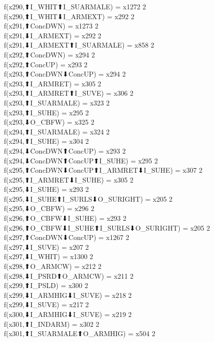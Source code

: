 f(x290,⬆I_WHIT⬆I_SUARMALE) = x1272 {2} \\
f(x290,⬆I_WHIT⬇I_ARMEXT) = x292 {2} \\
f(x291,⬆ConcDWN) = x1273 {2} \\
f(x291,⬇I_ARMEXT) = x292 {2} \\
f(x291,⬇I_ARMEXT⬆I_SUARMALE) = x858 {2} \\
f(x292,⬆ConcDWN) = x294 {2} \\
f(x292,⬆ConcUP) = x293 {2} \\
f(x293,⬆ConcDWN⬇ConcUP) = x294 {2} \\
f(x293,⬆I_ARMRET) = x305 {2} \\
f(x293,⬆I_ARMRET⬆I_SUVE) = x306 {2} \\
f(x293,⬆I_SUARMALE) = x323 {2} \\
f(x293,⬆I_SUHE) = x295 {2} \\
f(x293,⬇O_CBFW) = x325 {2} \\
f(x294,⬆I_SUARMALE) = x324 {2} \\
f(x294,⬆I_SUHE) = x304 {2} \\
f(x294,⬇ConcDWN⬆ConcUP) = x293 {2} \\
f(x294,⬇ConcDWN⬆ConcUP⬆I_SUHE) = x295 {2} \\
f(x295,⬆ConcDWN⬇ConcUP⬆I_ARMRET⬇I_SUHE) = x307 {2} \\
f(x295,⬆I_ARMRET⬇I_SUHE) = x305 {2} \\
f(x295,⬇I_SUHE) = x293 {2} \\
f(x295,⬇I_SUHE⬆I_SURLS⬇O_SURIGHT) = x205 {2} \\
f(x295,⬇O_CBFW) = x296 {2} \\
f(x296,⬆O_CBFW⬇I_SUHE) = x293 {2} \\
f(x296,⬆O_CBFW⬇I_SUHE⬆I_SURLS⬇O_SURIGHT) = x205 {2} \\
f(x297,⬆ConcDWN⬇ConcUP) = x1267 {2} \\
f(x297,⬇I_SUVE) = x207 {2} \\
f(x297,⬇I_WHIT) = x1300 {2} \\
f(x298,⬆O_ARMCW) = x212 {2} \\
f(x298,⬇I_PSRD⬆O_ARMCW) = x211 {2} \\
f(x299,⬆I_PSLD) = x300 {2} \\
f(x299,⬇I_ARMHIG⬇I_SUVE) = x218 {2} \\
f(x299,⬇I_SUVE) = x217 {2} \\
f(x300,⬇I_ARMHIG⬇I_SUVE) = x219 {2} \\
f(x301,⬆I_INDARM) = x302 {2} \\
f(x301,⬆I_SUARMALE⬆O_ARMHIG) = x504 {2} \\
